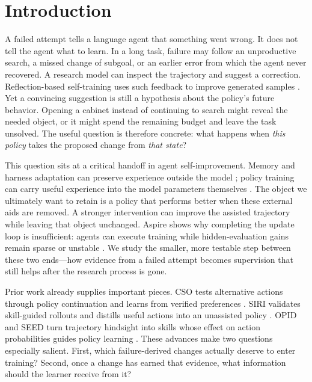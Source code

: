 \section{Introduction}
\label{sec:introduction}
A failed attempt tells a language agent that something went wrong. It does
not tell the agent what to learn. In a long task, failure may follow an
unproductive search, a missed change of subgoal, or an earlier error from
which the agent never recovered. A research model can inspect the
trajectory and suggest a correction. Reflection-based self-training uses
such feedback to improve generated samples \citep{dou2024rerest}.
Yet a convincing suggestion is still a hypothesis
about the policy's future behavior. Opening a cabinet instead of continuing
to search might reveal the needed object, or it might spend the remaining
budget and leave the task unsolved. The useful question is therefore concrete:
what happens when \emph{this policy} takes the proposed change from
\emph{that state}?

This question sits at a critical handoff in agent self-improvement. Memory
and harness adaptation can preserve experience outside the model
\citep{shinn2023reflexion,yu2026recuris}; policy training can carry useful
experience into the model parameters themselves
\citep{chen2026evotrainer,yang2026frontis}. The object we ultimately want to
retain is a policy that performs better when these external aids are
removed. A stronger intervention can improve the assisted trajectory
while leaving that object unchanged. Aspire shows why completing the
update loop is insufficient: agents can execute training while hidden-evaluation
gains remain sparse or unstable \citep{wu2026aspire}. We study the smaller,
more testable step between these two ends---how evidence from a failed attempt
becomes supervision that still helps after the research process is gone.

Prior work already supplies important pieces. CSO tests alternative actions
through policy continuation and learns from verified preferences
\citep{li2026cso}. SIRI validates skill-guided rollouts and distills useful
actions into an unassisted policy \citep{he2026siri}. OPID and SEED turn
trajectory hindsight into skills whose effect on action probabilities guides
policy learning \citep{yang2026opid,wu2026seed}. These advances make two
questions especially salient. First, which failure-derived changes actually
deserve to enter training? Second, once a change has earned that evidence,
what information should the learner receive from it?

